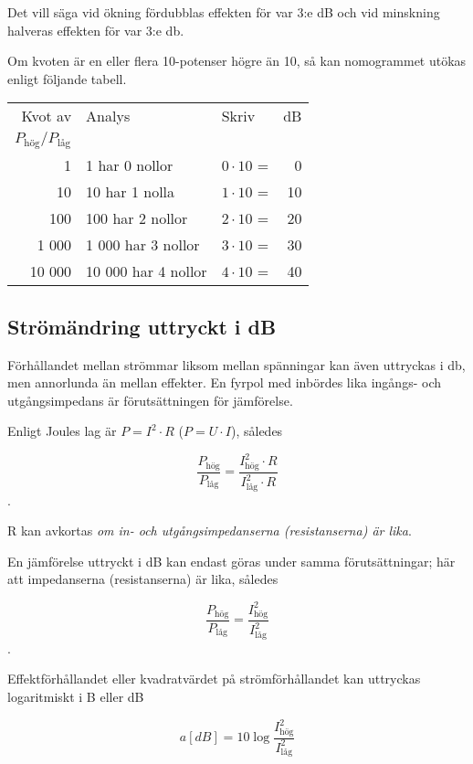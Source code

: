Det vill säga vid ökning fördubblas effekten för var 3:e dB och vid minskning
halveras effekten för var 3:e \si{\decibel}.

Om kvoten är en eller flera 10-potenser högre än 10, så kan nomogrammet utökas
enligt följande tabell.

\begin{tabular}{rllr}
Kvot av & Analys             & Skriv            & dB \\
\(P_\text{hög}/P_\text{låg}\) &          &                  &    \\
     1 & 1 har 0 nollor      & \(0 \cdot 10\) = &  0 \\
    10 & 10 har 1 nolla      & \(1 \cdot 10\) = & 10 \\
   100 & 100 har 2 nollor    & \(2 \cdot 10\) = & 20 \\
 1 000 &  1 000 har 3 nollor & \(3 \cdot 10\) = & 30 \\
10 000 & 10 000 har 4 nollor & \(4 \cdot 10\) = & 40
\end{tabular}

\subsection{Strömändring uttryckt i dB}

Förhållandet mellan strömmar liksom mellan spänningar kan även uttryckas i
\si{\decibel}, men annorlunda än mellan effekter.
En fyrpol med inbördes lika ingångs- och utgångsimpedans är förutsättningen för
jämförelse.

Enligt Joules lag är \(P = I^2 \cdot R\) (\(P = U \cdot I\)), således

\[\dfrac{P_\text{hög}}{P_\text{l{\aa}g}} = \dfrac{I_\text{hög}^2 \cdot R}{I_\text{l{\aa}g}^2 \cdot R}\].

R kan avkortas \emph{om in- och utgångsimpedanserna (resistanserna) är lika}.

En jämförelse uttryckt i dB kan endast göras under samma förutsättningar;
här att impedanserna (resistanserna) är lika, således

\[\dfrac{P_\text{hög}}{P_\text{låg}} = \dfrac{I_\text{hög}^2}{I_\text{låg}^2}\].

Effektförhållandet eller kvadratvärdet på strömförhållandet kan uttryckas
logaritmiskt i B eller dB

\[a[dB] = 10\log \dfrac{I_\text{hög}^2}{I_\text{låg}^2}\]

